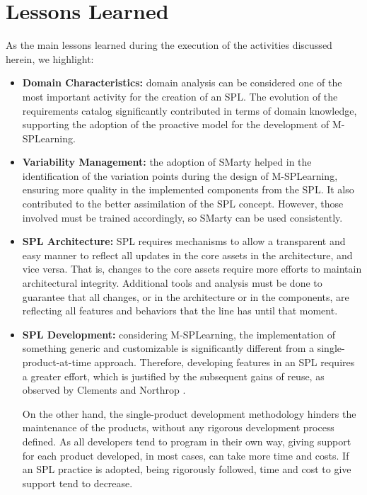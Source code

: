\section{Lessons Learned}\label{section4}

As the main lessons learned during the execution of the activities discussed herein, we highlight:

\begin{itemize}
\setlength\itemsep{1em}
\item \textbf{Domain Characteristics:} domain analysis can be considered one of the most important activity for the creation of an SPL. The evolution of the requirements catalog \cite{filho13} significantly contributed in terms of domain knowledge, supporting the adoption of the proactive model for the development of M-SPLear\allowbreak ning.
    
\item \textbf{Variability Management:} the adoption of SMarty helped in the identification of the variation points during the design of M-SPLear\allowbreak ning, ensuring more quality in the implemented components from the SPL. It also contributed to the better assimilation of the SPL concept. However, those involved must be trained accordingly, so SMarty can be used consistently.
    
\item \textbf{SPL Architecture:} SPL requires mechanisms to allow a transparent and easy manner to reflect all updates in the core assets in the architecture, and vice versa. That is, changes to the core assets require more efforts to maintain architectural integrity. Additional tools and analysis must be done to guarantee that all changes, or in the architecture or in the components, are reflecting all features and behaviors that the line has until that moment.
    
\item \textbf{SPL Development:} considering M-SPLear\allowbreak ning, the implementation of something generic and customizable is significantly different from a single-product-at-time approach. Therefore, developing features in an SPL requires a greater effort, which is justified by the subsequent gains of reuse, as observed by Clements and Northrop \cite{clements2001}.

On the other hand, the single-product development methodology hinders the maintenance of the products, without any rigorous development process defined. As all developers tend to program in their own way, giving support for each product developed, in most cases, can take more time and costs. If an SPL practice is adopted, being rigorously followed, time and cost to give support tend to decrease.
    

\end{itemize}

